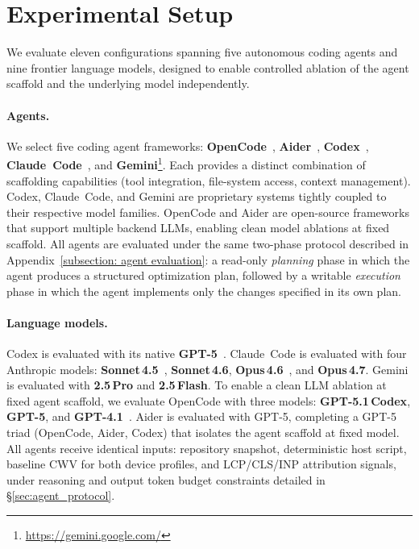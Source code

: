 \section{Experimental Setup}
\label{sec:experiments}
We evaluate eleven configurations spanning five autonomous coding agents and nine frontier language models, designed to enable controlled ablation of the agent scaffold and the underlying model independently.

\paragraph{Agents.}
We select five coding agent frameworks: \textbf{OpenCode}~\cite{opencode_ai}, \textbf{Aider}~\cite{aider_chat}, \textbf{Codex}~\cite{chen2021codex}, \textbf{Claude~Code}~\cite{anthropic_claude_code}, and \textbf{Gemini}\footnote{\url{https://gemini.google.com/}}.
Each provides a distinct combination of scaffolding capabilities (tool integration, file-system access, context management). Codex, Claude~Code, and Gemini are proprietary systems tightly coupled to their respective model families. OpenCode and Aider are open-source frameworks that support multiple backend LLMs, enabling clean model ablations at fixed scaffold. All agents are evaluated under the same two-phase protocol described in Appendix~\ref{subsection: agent evaluation}: a read-only \emph{planning} phase in which the agent produces a structured optimization plan, followed by a writable \emph{execution} phase in which the agent implements only the changes specified in its own plan.

\paragraph{Language models.}
Codex is evaluated with its native \textbf{GPT-5}~\cite{openai_gpt5_page}. Claude~Code is evaluated with four Anthropic models: \textbf{Sonnet\,4.5}~\cite{anthropic_claude_sonnet_45}, \textbf{Sonnet\,4.6}, \textbf{Opus\,4.6}~\cite{anthropic_claude_opus_4_6_system_card_2026}, and \textbf{Opus\,4.7}. Gemini is evaluated with \textbf{2.5\,Pro} and \textbf{2.5\,Flash}. To enable a clean LLM ablation at fixed agent scaffold, we evaluate OpenCode with three models: \textbf{GPT-5.1\,Codex}, \textbf{GPT-5}, and \textbf{GPT-4.1}~\cite{openai_gpt41_2025}. Aider is evaluated with GPT-5, completing a GPT-5 triad (OpenCode, Aider, Codex) that isolates the agent scaffold at fixed model. All agents receive identical inputs: repository snapshot, deterministic host script, baseline CWV for both device profiles, and LCP/CLS/INP attribution signals, under reasoning and output token budget constraints detailed in \S\ref{sec:agent_protocol}.

